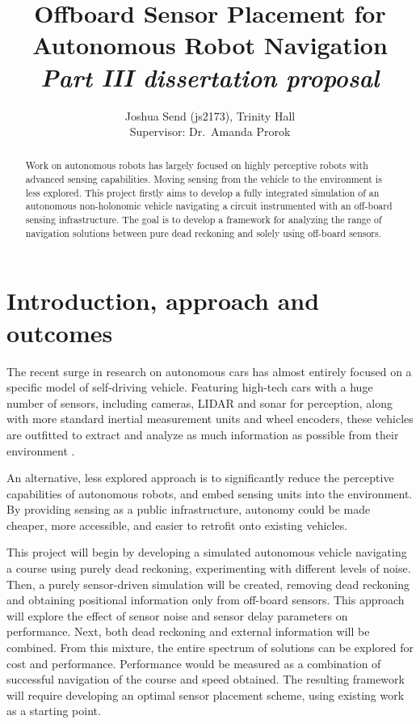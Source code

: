 \documentclass[12pt]{article}
\title{
	Offboard Sensor Placement for Autonomous Robot Navigation \\
	\vspace{2mm}
	\Large{\textit{Part III dissertation proposal}}
}
\author{
	Joshua Send (js2173), Trinity Hall \\
	Supervisor: Dr.~Amanda Prorok
}
\date{} %
\begin{document}
\maketitle


\begin{abstract}

Work on autonomous robots has largely focused on highly perceptive robots with advanced sensing capabilities. Moving sensing from the vehicle to the environment is less explored. This project firstly aims to develop a fully integrated simulation of an autonomous non-holonomic vehicle navigating a circuit instrumented with an off-board sensing infrastructure. The goal is to develop a framework for analyzing the range of navigation solutions between pure dead reckoning and solely using off-board sensors.

\end{abstract}

\section{Introduction, approach and outcomes}

The recent surge in research on autonomous cars has almost entirely focused on a specific model of self-driving vehicle. Featuring high-tech cars with a huge number of sensors, including cameras, LIDAR and sonar for perception, along with more standard inertial measurement units and wheel encoders, these vehicles are outfitted to extract and analyze as much information as possible from their environment \cite{lee2015gps}.

An alternative, less explored approach is to significantly reduce the perceptive capabilities of autonomous robots, and embed sensing units into the environment. By providing sensing as a public infrastructure, autonomy could be made cheaper, more accessible, and easier to retrofit onto existing vehicles. 

This project will begin by developing a simulated autonomous vehicle navigating a course using purely dead reckoning, experimenting with different levels of noise. Then, a purely sensor-driven simulation will be created, removing dead reckoning and obtaining positional information only from off-board sensors. This approach will explore the effect of sensor noise and sensor delay parameters on performance. Next, both dead reckoning and external information will be combined. From this mixture, the entire spectrum of solutions can be explored for cost and performance. Performance would be measured as a combination of successful navigation of the course and speed obtained. The resulting framework will require developing an optimal sensor placement scheme, using existing work \cite{beinhofer2013effective} \cite{allen2014range} as a starting point.
\end{document}
